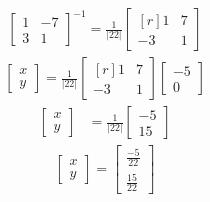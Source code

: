\documentclass{article}
\begin{document}
\begin{align*}
 \begin{bmatrix}
          {1} & {-7} \\ 
          {3} & {1}
       \end{bmatrix}^{-1} = 
       \frac{1}{\lvert 22\rvert}
       \begin{bmatrix*}[r]
           {1} & {7} \\ 
          {-3} &  {1}
       \end{bmatrix*} 
\end{align*}
\begin{align*}
     \left[\begin{array}{cc}
           x\\
           y
          \end{array}
                     \right]
                            =\frac{1}{\lvert 22\rvert}
                             \begin{bmatrix*}[r]
                                {1} & {7} \\ 
                                {-3} &  {1}
                             \end{bmatrix*} \left[\begin{array}{cc}
                                              -5\\
                                               0
                                           \end{array}
                                                      \right]
\end{align*}
\begin{align*}
 \left[\begin{array}{cc}
           x\\
           y
          \end{array}
                     \right]  & = 
                              \frac{1}{\lvert 22\rvert}
                              \left[\begin{array}{cc}
                                              -5\\
                                               15
                                           \end{array}
                                                      \right]
\end{align*}
\begin{align*}
    \left[
  \begin{array}{cc}
x\\
y
\end{array}
           \right]
                   =\left[\begin{array}{cc}
                      \frac{-5}{22}
                         \\
                        \frac{15}{22}
                         \end{array}
                           \right]
\end{align*}
\end{document}
